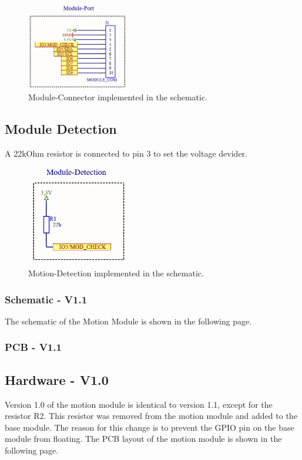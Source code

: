             \begin{figure}[H]
                \centering
                \includegraphics[width=0.4\textwidth]{assets/HW/Motion-Module-Port.png}
                \caption{Module-Connector implemented in the schematic.}
            \end{figure}

        \subsection{Module Detection}
            A 22kOhm resistor is connected to pin 3 to set the voltage devider.

            \begin{figure}[H]
                \centering
                \includegraphics[width=0.4\textwidth]{assets/HW/Motion-Module-Check.png}
                \caption{Motion-Detection implemented in the schematic.}
            \end{figure}

        \subsubsection{Schematic - V1.1}
            The schematic of the Motion Module is shown in the following page.
            
            


        \subsubsection{PCB - V1.1}    
           
        
    \subsection {Hardware - V1.0} 
            Version 1.0 of the motion module is identical to version 1.1, except for the resistor R2.
            This resistor was removed from the motion module and added to the base module. The
            reason for this change is to prevent the GPIO pin on the base module from floating. 
            The PCB layout of the motion module is shown in the following page.